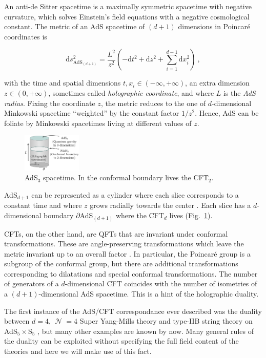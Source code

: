 \documentclass[twocolumn]{revtex4}
\providecommand{\eq}[2]{
    \begin{equation}
        #2
    \label{eq:#1}
    \end{equation}
}
\DeclareMathOperator{\calN}{\mathcal{N}}
\begin{document}
An anti-de Sitter spacetime is a maximally symmetric spacetime with negative curvature, which solves Einstein's field equations with a negative cosmological constant. The metric of an AdS spacetime of $(d+1)$ dimensions in Poincar\'e coordinates is 
\eq{AdS_PP-metric}{
    \mathrm{d} s_{\text{AdS}_{(d+1)}}^2 = \frac{L^2}{z^2} \left( -\mathrm{d} t^2 + \mathrm{d} z^2 + \sum_{i=1}^{d-1} \mathrm{d} x_i^2 \right) \ ,
}
with the time and spatial dimensions $t , x_i \in (-\infty,+\infty)$, an extra dimension $z \in (0,+\infty)$, sometimes called \emph{holographic coordinate}, and where $L$ is the \emph{AdS radius}. Fixing the coordinate $z$, the metric reduces to the one of $d$-dimensional Minkowski spacetime ``weighted'' by the constant factor $1/z^2$. Hence, AdS can be foliate by Minkowski spacetimes living at different values of $z$.


\begin{figure}
    \centering
    \includegraphics[width=0.25\textwidth]{../imatges/AdS_Cylindric.png}
\caption{AdS$_3$ spacetime. In the conformal boundary lives the CFT$_2$.}
\label{fig:AdS}
\end{figure}

AdS$_{d+1}$ can be represented as a cylinder where each slice corresponds to a constant time and where  $z$ grows radially towards the center \cite{hawking_large_2008}. Each slice has a $d$-dimensional boundary $\partial$AdS$_{(d+1)}$ where the CFT$_d$ lives (Fig.~\ref{fig:AdS}).

CFTs, on the other hand, are QFTs that are invariant under conformal transformations. These are angle-preserving transformations which leave the metric invariant up to an overall factor \cite{di_francesco_conformal_1997}. In particular, the Poincar\'e group is a subgroup of the conformal group, but there are additional transformations corresponding to dilatations and special conformal transformations. The number of generators of a $d$-dimensional CFT coincides with the number of isometries of a $(d+1)$-dimensional AdS spacetime. This is a hint of the holographic duality.

The first instance of the AdS/CFT correspondance ever described was the duality between $d=4$, $\calN=4$ Super Yang-Mills theory and type-IIB string theory on AdS$_5 \times $S$_5$ \cite{maldacena_large_1999}, but many other examples are known by now. Many general rules of the duality can be exploited without specifying the full field content of the theories and here we will make use of this fact.
\end{document}
